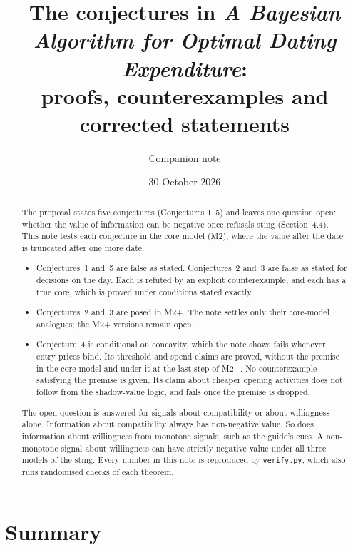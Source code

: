 \documentclass[11pt,a4paper]{article}
\title{The conjectures in \emph{A Bayesian Algorithm for Optimal Dating Expenditure}:\\ proofs, counterexamples and corrected statements}
\author{Companion note}
\date{30 October 2026}
\theoremstyle{definition}
\theoremstyle{remark}
\begin{document}
\maketitle

\begin{abstract}
The proposal states five conjectures (Conjectures 1--5) and leaves one question open: whether the value of information can be negative once refusals sting (Section~4.4). This note tests each conjecture in the core model (M2), where the value after the date is truncated after one more date.
\begin{itemize}[nosep]
\item Conjectures~1 and~5 are false as stated. Conjectures~2 and~3 are false as stated for decisions on the day. Each is refuted by an explicit counterexample, and each has a true core, which is proved under conditions stated exactly.
\item Conjectures~2 and~3 are posed in M2+. The note settles only their core-model analogues; the M2+ versions remain open.
\item Conjecture~4 is conditional on concavity, which the note shows fails whenever entry prices bind. Its threshold and spend claims are proved, without the premise in the core model and under it at the last step of M2+. No counterexample satisfying the premise is given. Its claim about cheaper opening activities does not follow from the shadow-value logic, and fails once the premise is dropped.
\end{itemize}
The open question is answered for signals about compatibility or about willingness alone. Information about compatibility always has non-negative value. So does information about willingness from monotone signals, such as the guide's cues. A non-monotone signal about willingness can have strictly negative value under all three models of the sting. Every number in this note is reproduced by \texttt{verify.py}, which also runs randomised checks of each theorem.
\end{abstract}

\section*{Summary}
\end{document}
